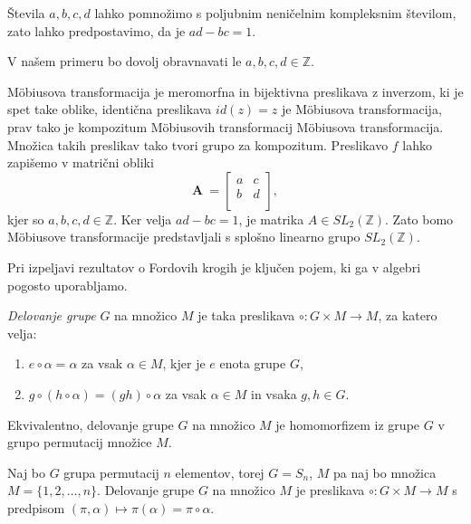 \documentclass[mat1]{fmfdelo}
\begin{document}
\begin{opomba}
Števila $a,b,c,d$ lahko pomnožimo s poljubnim neničelnim kompleksnim številom, zato lahko predpostavimo, da je $ad-bc=1$.

V našem primeru bo dovolj obravnavati le $a,b,c,d \in \mathbb{Z}$.
\end{opomba}

M\"{o}biusova transformacija je meromorfna in bijektivna preslikava z inverzom, ki je spet take oblike, identična preslikava $id(z)=z$ je M\"{o}biusova transformacija, prav tako je kompozitum M\"{o}biusovih transformacij M\"{o}biusova transformacija. Množica takih preslikav tako tvori grupo za kompozitum. 
Preslikavo $f$ lahko zapišemo v matrični obliki
\[
\mathbf{A}\ =
\left[
\begin{array}{cc}
a & c \\
b & d \\
\end{array}
\right],
\]
kjer so $a,b,c,d \in \mathbb{Z}$. Ker velja $ad-bc=1$, je matrika $A \in {SL}_{2}(\mathbb{Z})$. Zato bomo M\"{o}biusove transformacije predstavljali s splošno linearno grupo ${SL}_{2}(\mathbb{Z})$.

Pri izpeljavi rezultatov o Fordovih krogih je ključen pojem, ki ga v algebri pogosto uporabljamo.

\begin{definicija}
\emph{Delovanje grupe} $G$ na množico $M$ je taka preslikava \( \circ \colon G \times M \rightarrow M \), za katero velja:
\begin{enumerate}
	\item \( e \circ \alpha = \alpha \) za vsak $ \alpha \in M$, kjer je $e$ enota grupe $G$, 
	\item \( g \circ (h \circ \alpha) = (gh) \circ \alpha \) za vsak $\alpha \in M$ in vsaka $g,h \in G$.
\end{enumerate}

Ekvivalentno, delovanje grupe $G$ na množico $M$ je homomorfizem iz grupe $G$ v grupo permutacij množice $M$.
\end{definicija}

\begin{primer}
Naj bo $G$ grupa permutacij $n$ elementov, torej $G = S_{n}$, $M$ pa naj bo množica $M = \{1,2, \ldots, n \}$.
Delovanje grupe $G$ na množico $M$ je preslikava \( \circ \colon G \times M \rightarrow M \) s predpisom \( (\pi, \alpha) \mapsto \pi(\alpha) = \pi \circ \alpha \).
\end{primer}
\end{document}
